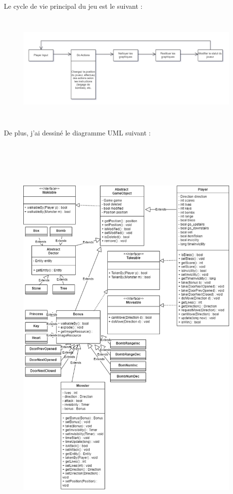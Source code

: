 \documentclass[11pt,english]{article}
\begin{document}
\indent Le cycle de vie principal du jeu est le suivant :

\begin{figure}[H]
    \begin{center}
        \includegraphics[height=5.5cm]{./src/cycle.png}
    \end{center}
\end{figure}

\indent De plus, j'ai dessiné le diagramme UML suivant :

\begin{figure}[H]
    \begin{center}
        \includegraphics[height = 21cm]{./src/UML_Class.png}
    \end{center}
\end{figure}
\end{document}
